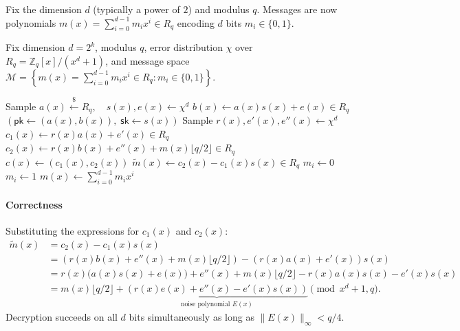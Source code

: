 Fix the dimension \(d\) (typically a power of \(2\)) and modulus \(q\).
Messages are now polynomials \(m(x) = \sum_{i=0}^{d-1} m_i x^i \in R_q\) encoding \(d\) bits \(m_i \in \{0, 1\}\).
\begin{definition}\label{def:ring-lwe-pke}
    Fix dimension \(d = 2^k\), modulus \(q\), error distribution \(\chi\) over \(R_q = \mathbb{Z}_q[x] / (x^d + 1)\), and message space \(\mathcal{M} = \left\{ m(x) = \sum_{i=0}^{d-1} m_i x^i \in R_q : m_i \in \{0, 1\} \right\}\).
    \begin{algorithmic}[1]
            \State Sample \(a(x) \xleftarrow{\$} R_q, \quad s(x), e(x) \leftarrow \chi^d\)
            \State \(b(x) \gets a(x)s(x) + e(x) \in R_q\)
            \State \Return \((\mathsf{pk} \gets (a(x), b(x)), \; \mathsf{sk} \gets s(x))\)
        \EndProcedure
        \Statex
            \State Sample \(r(x), e'(x), e''(x) \leftarrow \chi^d\)
            \State \(c_1(x) \gets r(x)a(x) + e'(x) \in R_q\)
            \State \(c_2(x) \gets r(x)b(x) + e''(x) + m(x) \lfloor q/2 \rfloor \in R_q\)
            \State \Return \(c(x) \gets (c_1(x), c_2(x))\)
        \EndProcedure
        \Statex
            \State \(\tilde{m}(x) \gets c_2(x) - c_1(x) s(x) \in R_q\)
                    \State \(m_i \gets 0\)
                \Else
                    \State \(m_i \gets 1\)
                \EndIf
            \EndFor
            \State \Return \(m(x) \gets \sum_{i=0}^{d-1} m_i x^i\)
        \EndProcedure
    \end{algorithmic}
\end{definition}

\paragraph*{Correctness}
Substituting the expressions for \(c_1(x)\) and \(c_2(x)\):
\begin{align*}
    \tilde{m}(x) &= c_2(x) - c_1(x) s(x) \\
                 &= \left( r(x)b(x) + e''(x) + m(x) \lfloor q/2 \rfloor \right) - \left( r(x)a(x) + e'(x) \right) s(x) \\
                 &= r(x)\bigl( a(x)s(x) + e(x) \bigr) + e''(x) + m(x) \lfloor q/2 \rfloor - r(x)a(x)s(x) - e'(x)s(x) \\
                 &= m(x) \lfloor q/2 \rfloor + \underbrace{\left( r(x)e(x) + e''(x) - e'(x)s(x) \right)}_{\text{noise polynomial } E(x)} \pmod{x^d + 1, q}.
\end{align*}
Decryption succeeds on all \(d\) bits simultaneously as long as \(\|E(x)\|_\infty < q/4\).

